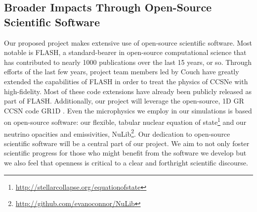\subsection{Broader Impacts Through Open-Source Scientific Software}

Our proposed project makes extensive use of open-source scientific software.
Most notable is FLASH, a standard-bearer in open-source computational science that has contributed to nearly 1000 publications over the last 15 years, or so.
Through efforts of the last few years, project team members led by Couch have greatly extended the capabilities of FLASH in order to treat the physics of CCSNe with high-fidelity.
Most of these code extensions have already been publicly released as part of FLASH.
Additionally, our project will leverage the open-source, 1D GR CCSN code GR1D \citep{OConnor:2010bi}.
Even the microphysics we employ in our simulations is based on open-source software: our flexible, tabular nuclear equation of state\footnote{\url{http://stellarcollapse.org/equationofstate}} and our neutrino opacities and emissivities, NuLib\footnote{\url{http://github.com/evanoconnor/NuLib}}.
Our dedication to open-source scientific software will be a central part of our project.
We aim to not only foster scientific progress for those who might benefit from the software we develop but we also feel that openness is critical to a clear and forthright scientific discourse.



%
